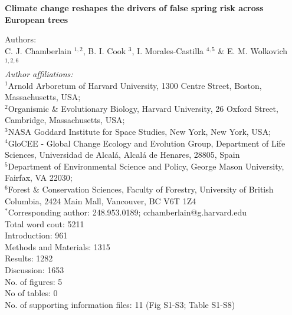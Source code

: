 \documentclass{article}\usepackage[]{graphicx}\usepackage[]{color}
\begin{document}
\noindent 
\textbf{\LARGE{Climate change reshapes the drivers of false spring risk across European trees}} 


\noindent Authors:\\
C. J. Chamberlain $^{1,2}$, B. I. Cook $^{3}$, I. Morales-Castilla $^{4,5}$ \& E. M. Wolkovich $^{1,2,6}$
\vspace{2ex}\\
\emph{Author affiliations:}\\
$^{1}$Arnold Arboretum of Harvard University, 1300 Centre Street, Boston, Massachusetts, USA; \\
$^{2}$Organismic \& Evolutionary Biology, Harvard University, 26 Oxford Street, Cambridge, Massachusetts, USA; \\
$^{3}$NASA Goddard Institute for Space Studies, New York, New York, USA; \\
$^{4}$GloCEE - Global Change Ecology and Evolution Group, Department of Life Sciences, Universidad de Alcal\'{a}, Alcal\'{a} de Henares, 28805, Spain \\
$^{5}$Department of Environmental Science and Policy, George Mason University, Fairfax, VA 22030; \\
$^{6}$Forest \& Conservation Sciences, Faculty of Forestry, University of British Columbia, 2424 Main Mall, Vancouver, BC V6T 1Z4\\
\vspace{2ex}
$^*$Corresponding author: 248.953.0189; cchamberlain@g.harvard.edu\\

Total word cout: 5211 \\
Introduction: 961 \\
Methods and Materials: 1315\\
Results: 1282\\
Discussion: 1653 \\ %

No. of figures: 5\\
No of tables: 0 \\
No. of supporting information files: 11 (Fig S1-S3; Table S1-S8)\\ 
\end{document}
